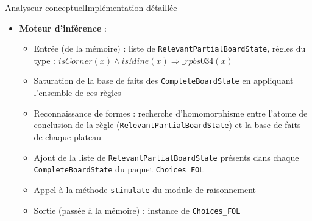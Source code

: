 \begin{frame}{Analyseur conceptuel}{Implémentation détaillée}
\begin{itemize}
\item \textbf {Moteur d'inférence} :
\begin{itemize}
  \item Entrée (de la mémoire) : liste de \texttt{RelevantPartialBoardState},
  règles du type : 
  \pause
  \emph{$isCorner(x) \wedge isMine(x) \Longrightarrow \_rpbs034(x)$}
  \pause
  \item Saturation de la base de faits des \texttt{CompleteBoardState} en
  appliquant l'ensemble de ces règles
  \pause
  \item Reconnaissance de formes : recherche d'homomorphisme entre l'atome de
  conclusion de la règle (\texttt{RelevantPartialBoardState}) et la base de
  faits de chaque plateau
  \pause
  \item Ajout de la liste de \texttt{RelevantPartialBoardState} présents dans
  chaque \texttt{CompleteBoardState} du paquet \texttt{Choices\_FOL}
  \pause
  \item Appel à la méthode \texttt{stimulate} du module de raisonnement
  \item Sortie (passée à la mémoire) : instance de \texttt{Choices\_FOL}
\end{itemize}
\end{itemize}
\end{frame}
